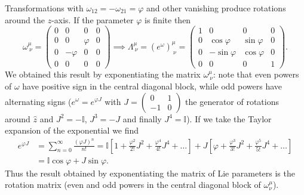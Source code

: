 \begin{example}
    Transformations with \(\omega_{12} = -\omega_{21} = \varphi\) and other vanishing produce rotations around the \(z\)-axis. If the parameter \(\varphi\) is finite then
    \[
        \omega^{\mu}_{\ \nu} = \begin{pmatrix}
            0 & 0        & 0       & 0 \\
            0 & 0        & \varphi & 0 \\
            0 & -\varphi & 0       & 0 \\
            0 & 0        & 0       & 0
        \end{pmatrix} \implies \Lambda^{\mu}_{\ \nu} = (e^{\omega})^{\mu}_{\ \nu} = \begin{pmatrix}
            1 & 0              & 0             & 0 \\
            0 & \cos{\varphi}  & \sin{\varphi} & 0 \\
            0 & -\sin{\varphi} & \cos{\varphi} & 0 \\
            0 & 0              & 0             & 1
        \end{pmatrix}.
    \]
    We obtained this result by exponentiating the matrix \(\omega^{\mu}_{\ \nu}\): note that even powers of \(\omega\) have positive sign in the central diagonal block, while odd powers have alternating signs (\(e^{\omega} = e^{\varphi J}\) with \(J = \begin{pmatrix}
        0  & 1 \\
        -1 & 0
    \end{pmatrix}\) the generator of rotations around \(\hat{z}\) and \(J^2 = -\mathbb{I}\), \(J^3 = - J \) and finally \(J^4 = \mathbb{I}\)). If we take the Taylor expansion of the exponential we find
    \[
        \begin{aligned}
            e^{\varphi J} & = \sum_{n=0}^{\infty} \frac{(\varphi J)^n}{n!} = \mathbb{I} \left[1 + \frac{\varphi^2}{2!} J^2 + \frac{\varphi^4}{4!} J^4 + \dots \right] + J \left[\varphi + \frac{\varphi^3}{3!} J^2 + \frac{\varphi^5}{5!} J^4 + \dots \right] \\
                          & = \mathbb{I} \cos{\varphi} + J \sin{\varphi}.
        \end{aligned}
    \]
    Thus the result obtained by exponentiating the matrix of Lie parameters is the rotation matrix (even and odd powers in the central diagonal block of \(\omega^{\mu}_\nu\)).


\end{example}
